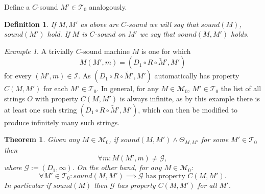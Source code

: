 \documentclass{amsart}  %
\numberwithin{equation}{section}
\newtheorem{theorem}[equation]{Theorem}
\newtheorem{lemma}[equation]{Lemma}
\newtheorem{definition}[equation]{Definition}
\theoremstyle{definition}
\theoremstyle{remark}
\newtheorem{example}{Example}
\begin{document}
{Define a $C$-sound $M' \in \mathcal{T} _{0} $ analogously. 
\begin{definition}
 If $M,M'$ as above are $C$-sound we will say that $sound (M)$, $sound (M')$ hold. If $M$ is $C$-sound on $M'$ we say that $sound (M,M')$ holds.
\end{definition}
 \begin{example} \label{example:trivial}
A trivially $C$-sound machine $M$ is one for which $$M (M',m) =  (D_1 \circ R \circ  \widetilde{M}', M') $$ for every $(M',m) \in \mathcal{I} $. 
As $(D_1 \circ R \circ  \widetilde{M}', M') $ automatically has property $C (M,M')$ 
for each $M' \in \mathcal{T}_{0} $.
In general, for any $M \in \mathcal{M} _{0} $, $M' \in \mathcal{T} _{0} $ the list of all strings $O$ with property $C (M,M')$ is always infinite, as by this example there is at least one such string $(D_1 \circ R \circ  \widetilde{M}', M')$, which can then be modified to produce infinitely many such strings. 
 \end{example}      
%    
    \begin{theorem} \label{thm:diagonalization} Given any $M \in \mathcal{M} _{0} $, if  $sound (M,M') \land \Theta _{M,M'} $ for some $M' \in \mathcal{T} _{0} $ then 
   $$\forall m:  M (M',m) \neq \mathcal{G}, $$   
where $\mathcal{G}:= (D_1,\infty).$
   On the other hand, for any $M \in \mathcal{M} _{0} $:
\begin{equation*}
\forall M' \in \mathcal{T} _{0}: sound (M,M') \implies \text{$\mathcal{G}$ has property $C (M,M')$}.
\end{equation*}
In particular if $sound (M)$ then $\mathcal{G}$ has property $C (M,M')$ for all $M'$.

\end{theorem}}
\end{document}
